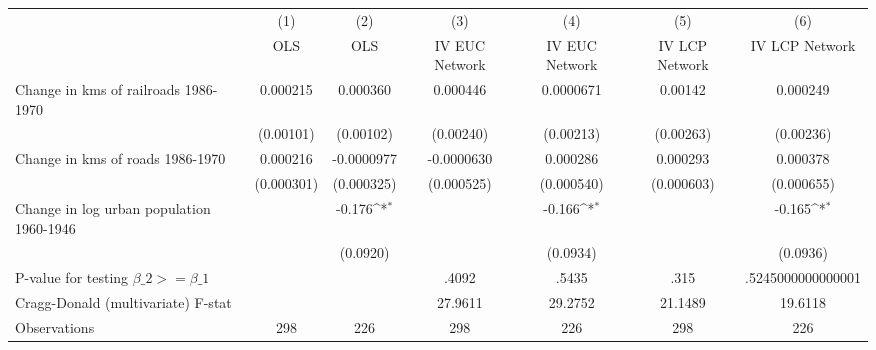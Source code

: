 {
\def\sym#1{\ifmmode^{#1}\else\(^{#1}\)\fi}
\begin{tabular}{l*{6}{c}}
\hline\hline
                &\multicolumn{1}{c}{(1)}&\multicolumn{1}{c}{(2)}&\multicolumn{1}{c}{(3)}&\multicolumn{1}{c}{(4)}&\multicolumn{1}{c}{(5)}&\multicolumn{1}{c}{(6)}\\
                &\multicolumn{1}{c}{OLS}&\multicolumn{1}{c}{OLS}&\multicolumn{1}{c}{IV EUC Network}&\multicolumn{1}{c}{IV EUC Network}&\multicolumn{1}{c}{IV LCP Network}&\multicolumn{1}{c}{IV LCP Network}\\
\hline
Change in kms of railroads 1986-1970& 0.000215         & 0.000360         & 0.000446         &0.0000671         &  0.00142         & 0.000249         \\
                &(0.00101)         &(0.00102)         &(0.00240)         &(0.00213)         &(0.00263)         &(0.00236)         \\
[1em]
Change in kms of roads 1986-1970& 0.000216         &-0.0000977         &-0.0000630         & 0.000286         & 0.000293         & 0.000378         \\
                &(0.000301)         &(0.000325)         &(0.000525)         &(0.000540)         &(0.000603)         &(0.000655)         \\
[1em]
Change in log urban population 1960-1946&                  &   -0.176\sym{*}  &                  &   -0.166\sym{*}  &                  &   -0.165\sym{*}  \\
                &                  & (0.0920)         &                  & (0.0934)         &                  & (0.0936)         \\
\hline
P-value for testing $\beta\_{2} >= \beta\_{1}$&                  &                  &    .4092         &    .5435         &     .315         &.5245000000000001         \\
Cragg-Donald (multivariate) F-stat&                  &                  &  27.9611         &  29.2752         &  21.1489         &  19.6118         \\
Observations    &      298         &      226         &      298         &      226         &      298         &      226         \\
\hline\hline
\end{tabular}
}
